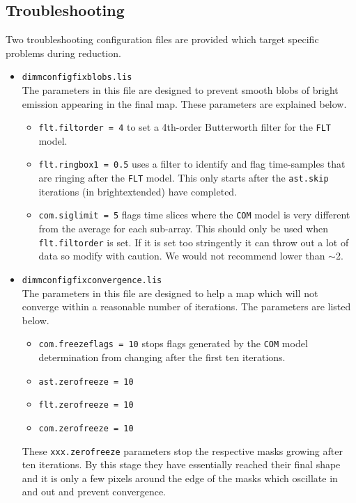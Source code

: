 \documentclass[twoside,11pt]{article}
\renewcommand{\_}{\texttt{\symbol{95}}}
\newcommand{\param}[1]{\texttt{#1}}
\newcommand{\file}[1]{\texttt{#1}}
\newcommand{\model}[1]{\texttt{#1}}
\begin{document}
\subsection{Troubleshooting}
Two troubleshooting configuration files are provided which target specific
problems during reduction.

\begin{itemize}
\item \file{dimmconfig\_fix\_blobs.lis}\\
The parameters in this file are designed to prevent smooth blobs of bright
emission appearing in the final map. These parameters are explained below.
\begin{itemize}[nolistsep]
  \item \param{flt.filt\_order~=~4} to set a 4th-order Butterworth filter for
  the \model{FLT} model.
  \item \param{flt.ring\_box1~=~0.5} uses a filter to identify and flag
  time-samples that are ringing after the \model{FLT} model. This only starts
  after the \param{ast.skip} iterations (in bright\_extended) have completed.
  \item \param{com.sig\_limit~=~5} flags time slices where the
  \model{COM} model is very different from the average for each
  sub-array. This should only be used when \param{flt.filt\_order} is set. If
  it is set too stringently it can throw out a lot of data so modify with
  caution. We would not recommend lower than $\sim$2.
\end{itemize}
\end{itemize}

\begin{itemize}
\item \file{dimmconfig\_fix\_convergence.lis}\\
The parameters in this file are designed to help a map which will not
converge within a reasonable number of iterations. The parameters are
listed below.
\begin{itemize}[nolistsep]
\item \param{com.freeze\_flags~=~10} stops flags generated by the \model{COM}
model determination from changing after the first ten iterations.
\item \param{ast.zero\_freeze~=~10}
\item \param{flt.zero\_freeze~=~10}
\item \param{com.zero\_freeze~=~10}
\end{itemize}
These \param{xxx.zero\_freeze} parameters stop the respective masks
growing after ten iterations. By this stage they have essentially reached
their final shape and it is only a few pixels around the edge of the masks
which oscillate in and out and prevent convergence.\\
\end{itemize}
\end{document}
